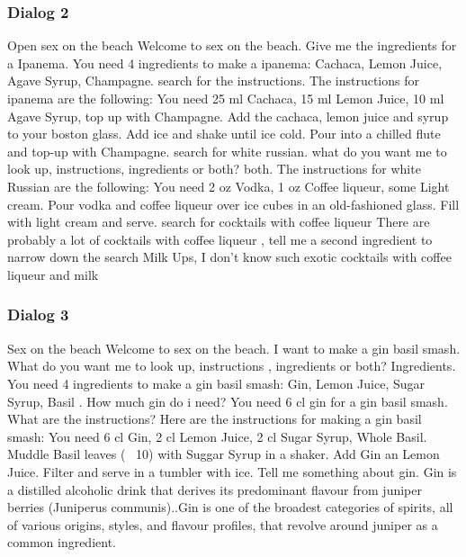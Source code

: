 \documentclass[12pt,letterpaper]{article}
\begin{document}
\subsubsection{Dialog 2}
\begin{dialogue}
	 Open sex on the beach
	 Welcome to sex on the beach.
	 Give me the ingredients for a Ipanema.
	 You need 4 ingredients to make a ipanema:
	Cachaca, Lemon Juice, Agave Syrup, Champagne.
	 search for the instructions.
	The instructions for ipanema are the following: You need 25 ml Cachaca, 15 ml Lemon Juice, 10 ml Agave Syrup, top up with Champagne. Add the cachaca, lemon juice and syrup to your boston glass. Add ice and shake until ice cold. Pour into a chilled flute and top-up with Champagne.
	 search for white russian.
	 what do you want me to look up, instructions, ingredients or both?
	 both.
	 The instructions for white Russian are the following: You need 2 oz Vodka, 1 oz Coffee liqueur, some Light cream. Pour vodka and coffee liqueur over ice cubes in an old-fashioned glass. Fill with light cream and serve.
	 search for cocktails with coffee liqueur
	 There are probably a lot of cocktails with coffee liqueur ,
	tell me a second ingredient to narrow down the search
	 Milk
	 Ups, I don't know such exotic cocktails with coffee liqueur and milk
\end{dialogue}
\subsubsection{Dialog 3}
\begin{dialogue}
	 Sex on the beach
	 Welcome to sex on the beach.
	 I want to make a gin basil smash.
	 What do you want me to look up, instructions , ingredients or both?
	 Ingredients.
	 You need 4 ingredients to make a gin basil smash: Gin, Lemon Juice, Sugar Syrup, Basil .
	 How much gin do i need?
	 You need 6 cl gin for a gin basil smash.
	 What are the instructions?
	 Here are the instructions for making a gin basil smash: You need 6 cl Gin, 2 cl Lemon Juice, 2 cl Sugar Syrup, Whole Basil. Muddle Basil leaves (~ 10) with Suggar Syrup in a shaker. Add Gin an Lemon Juice. Filter and serve in a tumbler with ice.
	 Tell me something about gin.
	 Gin is a distilled alcoholic drink that derives its predominant flavour from juniper berries (Juniperus communis)..Gin is one of the broadest categories of spirits, all of various origins, styles, and flavour profiles, that revolve around juniper as a common ingredient.
	
\end{dialogue}
\end{document}
